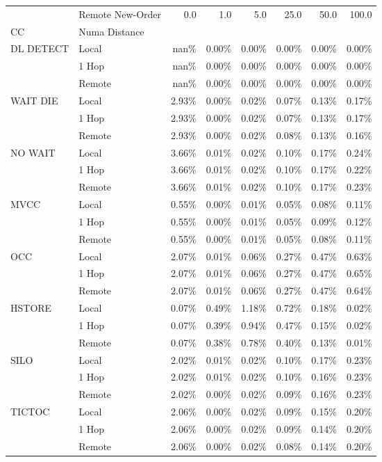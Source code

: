 \begin{tabular}{llrrrrrr}
\toprule
       & Remote New-Order &  0.0   &  1.0   &  5.0   &  25.0  &  50.0  &  100.0 \\
CC & Numa Distance &        &        &        &        &        &        \\
\midrule
DL DETECT & Local &   nan\% &  0.00\% &  0.00\% &  0.00\% &  0.00\% &  0.00\% \\
       & 1 Hop &   nan\% &  0.00\% &  0.00\% &  0.00\% &  0.00\% &  0.00\% \\
       & Remote &   nan\% &  0.00\% &  0.00\% &  0.00\% &  0.00\% &  0.00\% \\
WAIT DIE & Local &  2.93\% &  0.00\% &  0.02\% &  0.07\% &  0.13\% &  0.17\% \\
       & 1 Hop &  2.93\% &  0.00\% &  0.02\% &  0.07\% &  0.13\% &  0.17\% \\
       & Remote &  2.93\% &  0.00\% &  0.02\% &  0.08\% &  0.13\% &  0.16\% \\
NO WAIT & Local &  3.66\% &  0.01\% &  0.02\% &  0.10\% &  0.17\% &  0.24\% \\
       & 1 Hop &  3.66\% &  0.01\% &  0.02\% &  0.10\% &  0.17\% &  0.22\% \\
       & Remote &  3.66\% &  0.01\% &  0.02\% &  0.10\% &  0.17\% &  0.23\% \\
MVCC & Local &  0.55\% &  0.00\% &  0.01\% &  0.05\% &  0.08\% &  0.11\% \\
       & 1 Hop &  0.55\% &  0.00\% &  0.01\% &  0.05\% &  0.09\% &  0.12\% \\
       & Remote &  0.55\% &  0.00\% &  0.01\% &  0.05\% &  0.08\% &  0.11\% \\
OCC & Local &  2.07\% &  0.01\% &  0.06\% &  0.27\% &  0.47\% &  0.63\% \\
       & 1 Hop &  2.07\% &  0.01\% &  0.06\% &  0.27\% &  0.47\% &  0.65\% \\
       & Remote &  2.07\% &  0.01\% &  0.06\% &  0.27\% &  0.47\% &  0.64\% \\
HSTORE & Local &  0.07\% &  0.49\% &  1.18\% &  0.72\% &  0.18\% &  0.02\% \\
       & 1 Hop &  0.07\% &  0.39\% &  0.94\% &  0.47\% &  0.15\% &  0.02\% \\
       & Remote &  0.07\% &  0.38\% &  0.78\% &  0.40\% &  0.13\% &  0.01\% \\
SILO & Local &  2.02\% &  0.01\% &  0.02\% &  0.10\% &  0.17\% &  0.23\% \\
       & 1 Hop &  2.02\% &  0.01\% &  0.02\% &  0.10\% &  0.16\% &  0.23\% \\
       & Remote &  2.02\% &  0.00\% &  0.02\% &  0.09\% &  0.16\% &  0.23\% \\
TICTOC & Local &  2.06\% &  0.00\% &  0.02\% &  0.09\% &  0.15\% &  0.20\% \\
       & 1 Hop &  2.06\% &  0.00\% &  0.02\% &  0.09\% &  0.14\% &  0.20\% \\
       & Remote &  2.06\% &  0.00\% &  0.02\% &  0.08\% &  0.14\% &  0.20\% \\
\bottomrule
\end{tabular}
